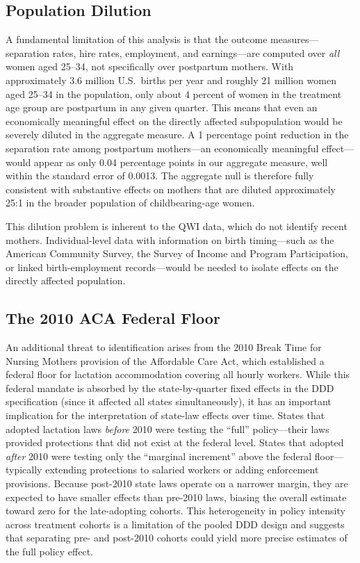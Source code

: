 \documentclass[12pt]{article}
\begin{document}
\subsection{Population Dilution}

A fundamental limitation of this analysis is that the outcome measures---separation rates, hire rates, employment, and earnings---are computed over \emph{all} women aged 25--34, not specifically over postpartum mothers. With approximately 3.6 million U.S.\ births per year and roughly 21 million women aged 25--34 in the population, only about 4 percent of women in the treatment age group are postpartum in any given quarter. This means that even an economically meaningful effect on the directly affected subpopulation would be severely diluted in the aggregate measure. A 1 percentage point reduction in the separation rate among postpartum mothers---an economically meaningful effect---would appear as only 0.04 percentage points in our aggregate measure, well within the standard error of 0.0013. The aggregate null is therefore fully consistent with substantive effects on mothers that are diluted approximately 25:1 in the broader population of childbearing-age women.

This dilution problem is inherent to the QWI data, which do not identify recent mothers. Individual-level data with information on birth timing---such as the American Community Survey, the Survey of Income and Program Participation, or linked birth-employment records---would be needed to isolate effects on the directly affected population.

\subsection{The 2010 ACA Federal Floor}

An additional threat to identification arises from the 2010 Break Time for Nursing Mothers provision of the Affordable Care Act, which established a federal floor for lactation accommodation covering all hourly workers. While this federal mandate is absorbed by the state-by-quarter fixed effects in the DDD specification (since it affected all states simultaneously), it has an important implication for the interpretation of state-law effects over time. States that adopted lactation laws \emph{before} 2010 were testing the ``full'' policy---their laws provided protections that did not exist at the federal level. States that adopted \emph{after} 2010 were testing only the ``marginal increment'' above the federal floor---typically extending protections to salaried workers or adding enforcement provisions. Because post-2010 state laws operate on a narrower margin, they are expected to have smaller effects than pre-2010 laws, biasing the overall estimate toward zero for the late-adopting cohorts. This heterogeneity in policy intensity across treatment cohorts is a limitation of the pooled DDD design and suggests that separating pre- and post-2010 cohorts could yield more precise estimates of the full policy effect.
\end{document}

